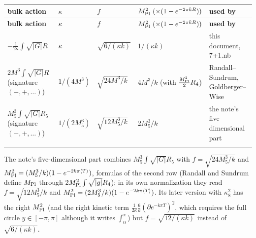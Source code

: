 \documentclass[10pt,a4paper]{article}
\begin{document}
{\small
\begin{longtable}{>{\raggedright\arraybackslash}p{}>{\raggedright\arraybackslash}p{}>{\raggedright\arraybackslash}p{}>{\raggedright\arraybackslash}p{}>{\raggedright\arraybackslash}p{}}
\toprule
\textbf{bulk action} & \textbf{$\kappa$} & \textbf{$f$} & \textbf{$M_{\rm Pl}^2\ (\times(1-e^{-2\pi kR}))$} & \textbf{used by} \\
\midrule\endfirsthead
\toprule
\textbf{bulk action} & \textbf{$\kappa$} & \textbf{$f$} & \textbf{$M_{\rm Pl}^2\ (\times(1-e^{-2\pi kR}))$} & \textbf{used by} \\
\midrule\endhead
\endfoot
\bottomrule\endlastfoot
$-\frac1{2\kappa}\int\sqrt{|G|}R$ & $\kappa$ & $\sqrt{6/(\kappa k)}$ & $1/(\kappa k)$ & this document, 7+1.nb \\
$2M^3\int\sqrt{|G|}R$ (signature $(-,+,\dots)$) & $1/(4M^3)$ & $\sqrt{24M^3/k}$ & $4M^3/k$ (with $\frac{M_{\rm Pl}^2}2R_4$) & Randall–Sundrum, Goldberger–Wise \\
$M_5^3\int\sqrt{|G|}R_5$ (signature $(-,+,\dots)$) & $1/(2M_5^3)$ & $\sqrt{12M_5^3/k}$ & $2M_5^3/k$ & the note’s five-dimensional part \\*
\end{longtable}}
The note’s five-dimensional part combines $M_5^3\int\sqrt{|G|}R_5$ with $f=\sqrt{24M_5^3/k}$ and $M_{\rm Pl}^2=(M_5^3/k)(1-e^{-2k\pi\langle T\rangle})$, formulas of the second row (Randall and Sundrum define $M_{\rm Pl}$ through $2M_{\rm Pl}^2\int\sqrt{|g|}R_4$); in its own normalization they read $f=\sqrt{12M_5^3/k}$ and $M_{\rm Pl}^2=(2M_5^3/k)(1-e^{-2k\pi\langle T\rangle})$. Its later version with $\kappa_8^2$ has the right $M_{\rm Pl}^2$ (and the right kinetic term $\frac1{2\kappa}\frac6k(\partial e^{-k\pi T})^2$, which requires the full circle $y\in[-\pi,\pi]$ although it writes $\int_0^\pi$) but $f=\sqrt{12/(\kappa k)}$ instead of $\sqrt{6/(\kappa k)}$.
\end{document}
